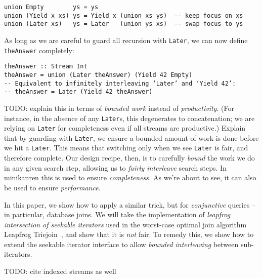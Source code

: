 \documentclass[acmsmall,screen,review,anonymous,dvipsnames,svgnames]{acmart}
\newcommand\hask[1]{\texttt{#1}}
\newcommand\ttt\texttt
\newcommand\todo[1]{{\color{Orange}#1}}
\begin{document}

\begin{verbatim}
union Empty        ys = ys
union (Yield x xs) ys = Yield x (union xs ys)  -- keep focus on xs
union (Later xs)   ys = Later   (union ys xs)  -- swap focus to ys
\end{verbatim}

\noindent
As long as we are careful to guard all recursion with \hask{Later}, we can now define \ttt{theAnswer} completely:

\begin{verbatim}
theAnswer :: Stream Int
theAnswer = union (Later theAnswer) (Yield 42 Empty)
-- Equivalent to infinitely interleaving ‘Later’ and ‘Yield 42’:
-- theAnswer = Later (Yield 42 theAnswer)
\end{verbatim}

\noindent
\todo{%
  TODO: explain this in terms of \emph{bounded work} instead of \emph{productivity}.
  (For instance, in the absence of any \hask{Later}s, this degenerates to concatenation; we are relying on \hask{Later} for completeness even if all streams are productive.)
  Explain that by guarding with \hask{Later}, we ensure a bounded amount of work is done before we hit a \hask{Later}.
  This means that switching only when we see \hask{Later} is fair, and therefore complete.
  Our design recipe, then, is to carefully \emph{bound} the work we do in any given search step, allowing us to \emph{fairly interleave} search steps.
  In minikanren this is used to ensure \emph{completeness.}
  As we're about to see, it can also be used to ensure \emph{performance.}
}


In this paper, we show how to apply a similar trick, but for \emph{conjunctive} queries -- in particular, database joins.
We will take the implementation of \emph{leapfrog intersection of seekable iterators} used in the worst-case optimal join algorithm Leapfrog Triejoin~\citep{lftj}, and show that it is \emph{not} fair.
To remedy this, we show how to extend the seekable iterator interface to allow \emph{bounded interleaving} between sub-iterators.

\todo{TODO: cite indexed streams as well}


\end{document}
